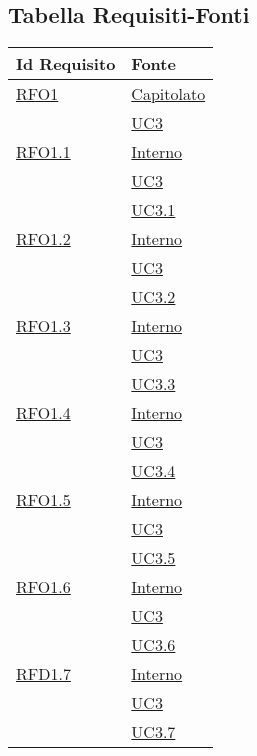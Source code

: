 \newpage
\subsection{Tabella Requisiti-Fonti}
\normalsize
\begin{longtable}{|>{\centering}m{5cm}|m{5cm}<{\centering}|}
\hline \rowcolor{Gray}
\textbf{Id Requisito} & \textbf{Fonte}\\
\hline
\endhead

\hyperlink{RFO1}{RFO1}
& \hyperlink{Capitolato}{Capitolato}\\
& \hyperref[UC3]{UC3}\\ \hline

\hyperlink{RFO1.1}{RFO1.1} 
& \hyperlink{Interno}{Interno}\\
& \hyperref[UC3]{UC3}\\
& \hyperref[UC3.1]{UC3.1}\\ \hline

\hyperlink{RFD1.2}{RFO1.2} 
& \hyperlink{Interno}{Interno}\\
& \hyperref[UC3]{UC3}\\
& \hyperref[UC3.2]{UC3.2}\\ \hline

\hyperlink{RFO1.3}{RFO1.3} 
& \hyperlink{Interno}{Interno}\\
& \hyperref[UC3]{UC3}\\
& \hyperref[UC3.3]{UC3.3}\\ \hline

\hyperlink{RFO1.4}{RFO1.4} 
& \hyperlink{Interno}{Interno}\\
& \hyperref[UC3]{UC3}\\
& \hyperref[UC3.4]{UC3.4}\\ \hline

\hyperlink{RFO1.5}{RFO1.5} 
& \hyperlink{Interno}{Interno}\\
& \hyperref[UC3]{UC3}\\
& \hyperref[UC3.5]{UC3.5}\\ \hline

\hyperlink{RFO1.6}{RFO1.6} 
& \hyperlink{Interno}{Interno}\\
& \hyperref[UC3]{UC3}\\
& \hyperref[UC3.6]{UC3.6}\\ \hline

\hyperlink{RFD1.7}{RFD1.7} 
& \hyperlink{Interno}{Interno}\\
& \hyperref[UC3]{UC3}\\
& \hyperref[UC3.7]{UC3.7}\\ \hline


\end{longtable}
